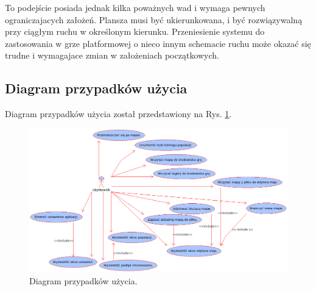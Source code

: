 \begin{par}
\begin{enumerate}
\begin{par}
		To podejście posiada jednak kilka poważnych wad i wymaga pewnych ograniczajacych założeń.
		Plansza musi być ukierunkowana, i być rozwiązywalną przy ciągłym ruchu w określonym kierunku.
		Przeniesienie systemu do zastosowania w grze platformowej o nieco innym schemacie ruchu może okazać się trudne i wymagajace zmian w założeniach początkowych.
	\end{par}
	\end{enumerate}
\end{par}



\subsection{Diagram przypadków użycia}
\begin{par}
	Diagram przypadków użycia został przedstawiony na Rys. \ref{fig:diagram_przypadkow}.
		\begin{figure}[!h]
		\centering
		\includegraphics[width=\textwidth]{obrazki/diagram_przypadkow.png}
		\caption{Diagram przypadków użycia.}
		\label{fig:diagram_przypadkow}
		\end{figure}
\end{par}

